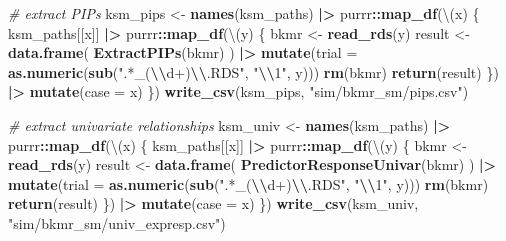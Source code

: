 \documentclass[12pt, twoside]{amherstthesis}
\newenvironment{Shaded}{\begin{snugshade}}{\end{snugshade}}
\newcommand{\AttributeTok}[1]{\textcolor[rgb]{0.13,0.29,0.53}{#1}}
\newcommand{\CommentTok}[1]{\textcolor[rgb]{0.56,0.35,0.01}{\textit{#1}}}
\newcommand{\FunctionTok}[1]{\textcolor[rgb]{0.13,0.29,0.53}{\textbf{#1}}}
\newcommand{\NormalTok}[1]{#1}
\newcommand{\OtherTok}[1]{\textcolor[rgb]{0.56,0.35,0.01}{#1}}
\newcommand{\SpecialCharTok}[1]{\textcolor[rgb]{0.81,0.36,0.00}{\textbf{#1}}}
\newcommand{\StringTok}[1]{\textcolor[rgb]{0.31,0.60,0.02}{#1}}
\begin{document}
\begin{Shaded}
\begin{Highlighting}[]
\CommentTok{\# extract PIP\textquotesingle{}s}
\NormalTok{ksm\_pips }\OtherTok{\textless{}{-}} \FunctionTok{names}\NormalTok{(ksm\_paths) }\SpecialCharTok{|\textgreater{}} 
\NormalTok{  purrr}\SpecialCharTok{::}\FunctionTok{map\_df}\NormalTok{(\textbackslash{}(x) \{}
\NormalTok{    ksm\_paths[[x]] }\SpecialCharTok{|\textgreater{}} 
\NormalTok{      purrr}\SpecialCharTok{::}\FunctionTok{map\_df}\NormalTok{(\textbackslash{}(y) \{}
\NormalTok{        bkmr }\OtherTok{\textless{}{-}} \FunctionTok{read\_rds}\NormalTok{(y)}
\NormalTok{        result }\OtherTok{\textless{}{-}} \FunctionTok{data.frame}\NormalTok{(}
          \FunctionTok{ExtractPIPs}\NormalTok{(bkmr)}
\NormalTok{        ) }\SpecialCharTok{|\textgreater{}} 
          \FunctionTok{mutate}\NormalTok{(}\AttributeTok{trial =} \FunctionTok{as.numeric}\NormalTok{(}\FunctionTok{sub}\NormalTok{(}\StringTok{".*\_(}\SpecialCharTok{\textbackslash{}\textbackslash{}}\StringTok{d+)}\SpecialCharTok{\textbackslash{}\textbackslash{}}\StringTok{.RDS"}\NormalTok{, }\StringTok{"}\SpecialCharTok{\textbackslash{}\textbackslash{}}\StringTok{1"}\NormalTok{, y)))}
        \FunctionTok{rm}\NormalTok{(bkmr)}
        \FunctionTok{return}\NormalTok{(result)}
\NormalTok{      \}) }\SpecialCharTok{|\textgreater{}} 
      \FunctionTok{mutate}\NormalTok{(}\AttributeTok{case =}\NormalTok{ x)}
\NormalTok{  \})}
\FunctionTok{write\_csv}\NormalTok{(ksm\_pips, }\StringTok{"sim/bkmr\_sm/pips.csv"}\NormalTok{)}

\CommentTok{\# extract univariate relationships}
\NormalTok{ksm\_univ }\OtherTok{\textless{}{-}} \FunctionTok{names}\NormalTok{(ksm\_paths) }\SpecialCharTok{|\textgreater{}} 
\NormalTok{  purrr}\SpecialCharTok{::}\FunctionTok{map\_df}\NormalTok{(\textbackslash{}(x) \{}
\NormalTok{    ksm\_paths[[x]] }\SpecialCharTok{|\textgreater{}} 
\NormalTok{      purrr}\SpecialCharTok{::}\FunctionTok{map\_df}\NormalTok{(\textbackslash{}(y) \{}
\NormalTok{        bkmr }\OtherTok{\textless{}{-}} \FunctionTok{read\_rds}\NormalTok{(y)}
\NormalTok{        result }\OtherTok{\textless{}{-}} \FunctionTok{data.frame}\NormalTok{(}
          \FunctionTok{PredictorResponseUnivar}\NormalTok{(bkmr)}
\NormalTok{        ) }\SpecialCharTok{|\textgreater{}} 
          \FunctionTok{mutate}\NormalTok{(}\AttributeTok{trial =} \FunctionTok{as.numeric}\NormalTok{(}\FunctionTok{sub}\NormalTok{(}\StringTok{".*\_(}\SpecialCharTok{\textbackslash{}\textbackslash{}}\StringTok{d+)}\SpecialCharTok{\textbackslash{}\textbackslash{}}\StringTok{.RDS"}\NormalTok{, }\StringTok{"}\SpecialCharTok{\textbackslash{}\textbackslash{}}\StringTok{1"}\NormalTok{, y)))}
        \FunctionTok{rm}\NormalTok{(bkmr)}
        \FunctionTok{return}\NormalTok{(result)}
\NormalTok{      \}) }\SpecialCharTok{|\textgreater{}} 
      \FunctionTok{mutate}\NormalTok{(}\AttributeTok{case =}\NormalTok{ x)}
\NormalTok{  \})}
\FunctionTok{write\_csv}\NormalTok{(ksm\_univ, }\StringTok{"sim/bkmr\_sm/univ\_expresp.csv"}\NormalTok{)}


\end{Highlighting}
\end{Shaded}
\end{document}

